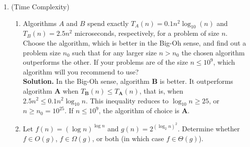 \documentclass[11pt]{article}
\begin{document}
\begin{enumerate}
  
  

\item (Time Complexity)

\begin{enumerate} 
\item Algorithms $A$ and $B$ spend exactly $T_{A}(n) = 0.1n^{2} \log_{10} (n)$ and $T_{B}(n) = 2.5n^{2}$ microseconds, respectively, for a problem of size $n$. Choose the algorithm, which is better in the Big-Oh sense, and find out a problem size $n_{0}$ such that for any larger size $n > n_{0}$ the chosen algorithm outperforms the other. If your problems are of the size $n \leq 10^{9}$, which algorithm will you recommend to use?\\

\textbf{Solution.}
In the Big-Oh sense, algorithm \textbf{B} is better. It outperforms algorithm \textbf{A} when $T_{\textbf{B}}(n) \leq T_{\textbf{A}}(n)$, that is, when $2.5 n^{2} \leq 0.1 n^{2} \log_{10} n$. This inequality reduces to $\log_{10} n \geq 25$, or $n \geq n_{0} = 10^{25}$. If $n \leq 10^{9}$, the algorithm of choice is \textbf{A}.

\item Let $f(n) = (\log n)^{\log n}$ and $g(n) = 2^{(\log_{2} n)^{2}}$. Determine whether $f \in O(g)$, $f \in \Omega(g)$, or both (in which case $f \in \Theta(g)$).\\


\end{enumerate}
\end{enumerate}
\end{document}
